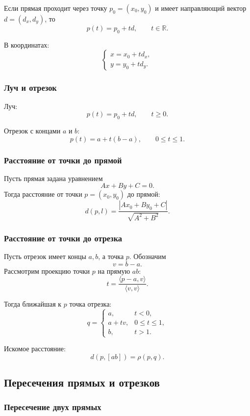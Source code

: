 \documentclass[12pt,a4paper]{article}
\begin{document}
Если прямая проходит через точку \(p_0=(x_0,y_0)\) и имеет направляющий вектор \(d=(d_x,d_y)\), то
\[
p(t)=p_0+td,
\qquad t\in\mathbb{R}.
\]

В координатах:
\[
\begin{cases}
x=x_0+td_x,\\
y=y_0+td_y.
\end{cases}
\]

\subsubsection{Луч и отрезок}

Луч:
\[
p(t)=p_0+td,\qquad t\ge 0.
\]

Отрезок с концами \(a\) и \(b\):
\[
p(t)=a+t(b-a),\qquad 0\le t\le 1.
\]

\subsubsection{Расстояние от точки до прямой}

Пусть прямая задана уравнением
\[
Ax+By+C=0.
\]
Тогда расстояние от точки \(p=(x_0,y_0)\) до прямой:
\[
d(p,l)=
\frac{|Ax_0+By_0+C|}{\sqrt{A^2+B^2}}.
\]

\subsubsection{Расстояние от точки до отрезка}

Пусть отрезок имеет концы \(a,b\), а точка \(p\). Обозначим
\[
v=b-a.
\]
Рассмотрим проекцию точки \(p\) на прямую \(ab\):
\[
t=\frac{\langle p-a,v\rangle}{\langle v,v\rangle}.
\]

Тогда ближайшая к \(p\) точка отрезка:
\[
q=
\begin{cases}
a, & t<0,\\
a+tv, & 0\le t\le 1,\\
b, & t>1.
\end{cases}
\]

Искомое расстояние:
\[
d(p,[ab])=\rho(p,q).
\]

\subsection{Пересечения прямых и отрезков}

\subsubsection{Пересечение двух прямых}
\end{document}
